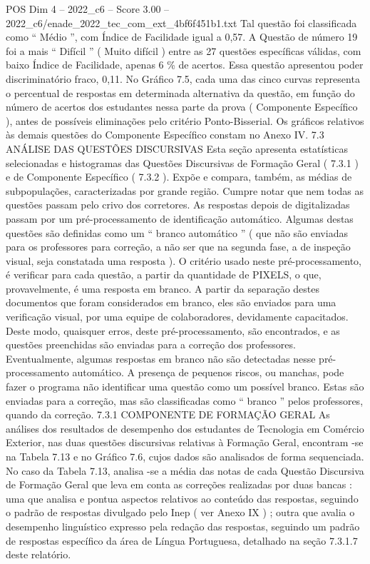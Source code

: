 \begin{textsample}{POS Dim 4 – 2022\_c6 – Score 3.00 – 2022\_c6/enade\_2022\_tec\_com\_ext\_4bf6f451b1.txt}
Tal questão foi classificada como “ Médio ”, com Índice de Facilidade igual a 0,57.
A Questão de número 19 foi a mais “ Difícil ” ( Muito difícil ) entre as 27 questões específicas válidas, com baixo Índice de Facilidade, apenas 6 \% de acertos.
Essa questão apresentou poder discriminatório fraco, 0,11.
No Gráfico 7.5, cada uma das cinco curvas representa o percentual de respostas em determinada alternativa da questão, em função do número de acertos dos estudantes nessa parte da prova ( Componente Específico ), antes de possíveis eliminações pelo critério Ponto-Bisserial.
Os gráficos relativos às demais questões do Componente Específico constam no Anexo IV. 7.3 ANÁLISE DAS QUESTÕES DISCURSIVAS Esta seção apresenta estatísticas selecionadas e histogramas das Questões Discursivas de Formação Geral ( 7.3.1 ) e de Componente Específico ( 7.3.2 ).
Expõe e compara, também, as médias de subpopulações, caracterizadas por grande região.
Cumpre notar que nem todas as questões passam pelo crivo dos corretores.
As respostas depois de digitalizadas passam por um pré-processamento de identificação automático.
Algumas destas questões são definidas como um “ branco automático ” ( que não são enviadas para os professores para correção, a não ser que na segunda fase, a de inspeção visual, seja constatada uma resposta ).
O critério usado neste pré-processamento, é verificar para cada questão, a partir da quantidade de PIXELS, o que, provavelmente, é uma resposta em branco.
A partir da separação destes documentos que foram considerados em branco, eles são enviados para uma verificação visual, por uma equipe de colaboradores, devidamente capacitados.
Deste modo, quaisquer erros, deste pré-processamento, são encontrados, e as questões preenchidas são enviadas para a correção dos professores.
Eventualmente, algumas respostas em branco não são detectadas nesse pré-processamento automático.
A presença de pequenos riscos, ou manchas, pode fazer o programa não identificar uma questão como um possível branco.
Estas são enviadas para a correção, mas são classificadas como “ branco ” pelos professores, quando da correção. 7.3.1 COMPONENTE DE FORMAÇÃO GERAL As análises dos resultados de desempenho dos estudantes de Tecnologia em Comércio Exterior, nas duas questões discursivas relativas à Formação Geral, encontram -se na Tabela 7.13 e no Gráfico 7.6, cujos dados são analisados de forma sequenciada.
No caso da Tabela 7.13, analisa -se a média das notas de cada Questão Discursiva de Formação Geral que leva em conta as correções realizadas por duas bancas : uma que analisa e pontua aspectos relativos ao conteúdo das respostas, seguindo o padrão de respostas divulgado pelo Inep ( ver Anexo IX ) ; outra que avalia o desempenho linguístico expresso pela redação das respostas, seguindo um padrão de respostas específico da área de Língua Portuguesa, detalhado na seção 7.3.1.7 deste relatório.

\end{textsample}
